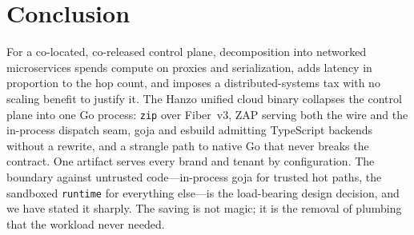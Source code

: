 \documentclass[11pt]{article}
\begin{document}
\section{Conclusion}

For a co-located, co-released control plane, decomposition into networked
microservices spends compute on proxies and serialization, adds latency in
proportion to the hop count, and imposes a distributed-systems tax with no
scaling benefit to justify it. The Hanzo unified cloud binary collapses the
control plane into one Go process: \texttt{zip} over Fiber~v3, ZAP serving
both the wire and the in-process dispatch seam, goja and esbuild admitting
TypeScript backends without a rewrite, and a strangle path to native Go
that never breaks the contract. One artifact serves every brand and tenant
by configuration. The boundary against untrusted code---in-process goja for
trusted hot paths, the sandboxed \texttt{runtime} for everything else---is
the load-bearing design decision, and we have stated it sharply. The saving
is not magic; it is the removal of plumbing that the workload never needed.

{\small


}
\end{document}
